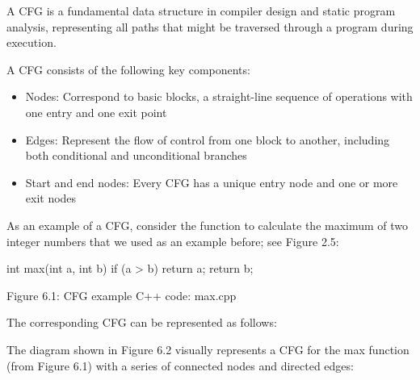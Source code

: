 A CFG is a fundamental data structure in compiler design and static program analysis, representing all paths that might be traversed through a program during execution.

A CFG consists of the following key components:

\begin{itemize}
\item
Nodes: Correspond to basic blocks, a straight-line sequence of operations with one entry and one exit point

\item
Edges: Represent the flow of control from one block to another, including both conditional and unconditional branches

\item
Start and end nodes: Every CFG has a unique entry node and one or more exit nodes
\end{itemize}

As an example of a CFG, consider the function to calculate the maximum of two integer numbers that we used as an example before; see Figure 2.5:

\begin{cpp}
int max(int a, int b) {
  if (a > b)
    return a;
  return b;
}
\end{cpp}

\begin{center}
Figure 6.1: CFG example C++ code: max.cpp
\end{center}

The corresponding CFG can be represented as follows:


The diagram shown in Figure 6.2 visually represents a CFG for the max function (from Figure 6.1) with a series of connected nodes and directed edges:


